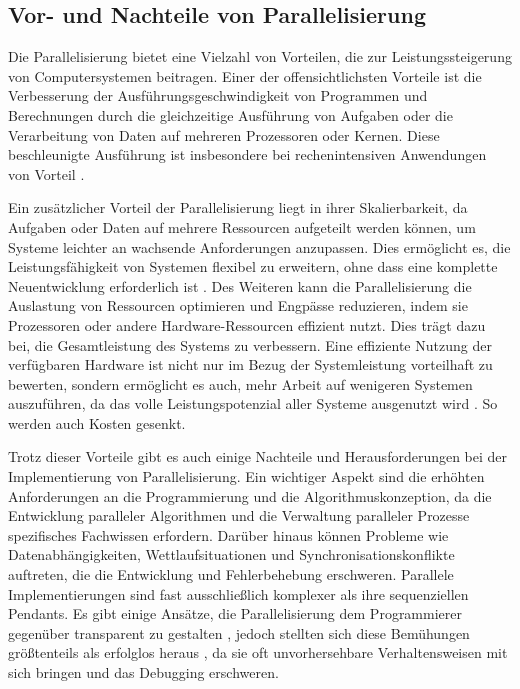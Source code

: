\subsection{Vor- und Nachteile von Parallelisierung}
\label{sec:Grundlagen_Parallelisierung_Vorteile_Nachteile}
Die Parallelisierung bietet eine Vielzahl von Vorteilen, die zur Leistungssteigerung von Computersystemen beitragen. Einer der offensichtlichsten Vorteile ist die Verbesserung der Ausführungsgeschwindigkeit von Programmen und Berechnungen durch die gleichzeitige Ausführung von Aufgaben oder die Verarbeitung von Daten auf mehreren Prozessoren oder Kernen. Diese beschleunigte Ausführung ist insbesondere bei rechenintensiven Anwendungen von Vorteil \citep{Flynn_Computer_Organizations_and_their_Effectiveness}.

Ein zusätzlicher Vorteil der Parallelisierung liegt in ihrer Skalierbarkeit, da Aufgaben oder Daten auf mehrere Ressourcen aufgeteilt werden können, um Systeme leichter an wachsende Anforderungen anzupassen. Dies ermöglicht es, die Leistungsfähigkeit von Systemen flexibel zu erweitern, ohne dass eine komplette Neuentwicklung erforderlich ist \citep{Flynn_Computer_Organizations_and_their_Effectiveness}.
Des Weiteren kann die Parallelisierung die Auslastung von Ressourcen optimieren und Engpässe reduzieren, indem sie Prozessoren oder andere Hardware-Ressourcen effizient nutzt. Dies trägt dazu bei, die Gesamtleistung des Systems zu verbessern. Eine effiziente Nutzung der verfügbaren Hardware ist nicht nur im Bezug der Systemleistung vorteilhaft zu bewerten, sondern ermöglicht es auch, mehr Arbeit auf wenigeren Systemen auszuführen, da das volle Leistungspotenzial aller Systeme ausgenutzt wird \citep{Flynn_Computer_Organizations_and_their_Effectiveness}. So werden auch Kosten gesenkt.

Trotz dieser Vorteile gibt es auch einige Nachteile und Herausforderungen bei der Implementierung von Parallelisierung. Ein wichtiger Aspekt sind die erhöhten Anforderungen an die Programmierung und die Algorithmuskonzeption, da die Entwicklung paralleler Algorithmen und die Verwaltung paralleler Prozesse spezifisches Fachwissen erfordern. Darüber hinaus können Probleme wie Datenabhängigkeiten, Wettlaufsituationen und Synchronisationskonflikte auftreten, die die Entwicklung und Fehlerbehebung erschweren. Parallele Implementierungen sind fast ausschließlich komplexer als ihre sequenziellen Pendants. Es gibt einige Ansätze, die Parallelisierung dem Programmierer gegenüber transparent zu gestalten \citep{Sidorenko_Subway_Train_Scheduling}, jedoch stellten sich diese Bemühungen größtenteils als erfolglos heraus \citep{the_problem_with_threads}, da sie oft unvorhersehbare Verhaltensweisen mit sich bringen und das Debugging erschweren. 

